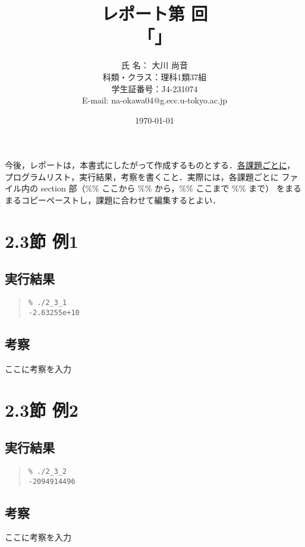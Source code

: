 \documentclass[fontsize=11pt, jafontsize=11pt, paper=a4paper, dvipdfmx]{jlreq}
\title{レポート第  回 \\
  「」}
\author{氏 名：  大川 尚音 \\
        科類・クラス：理科1類37組 \\
        学生証番号：J4-231074 \\
        E-mail: na-okawa04@g.ecc.u-tokyo.ac.jp}
\date{\today}
\begin{document}
\maketitle
%
今後，レポートは，本書式にしたがって作成するものとする．\underline{各課題ごとに}，
プログラムリスト，実行結果，考察を書くこと．実際には，各課題ごとに
ファイル内の section 部（\%\% ここから \%\% から，\%\% ここまで \%\% まで）
をまるまるコピーペーストし，課題に合わせて編集するとよい．

\section{2.3節 例1}

\subsection{実行結果}
\label{sec:results1}

\begin{quote}
\begin{verbatim}
% ./2_3_1
-2.63255e+10
\end{verbatim}
\end{quote}
%
\subsection{考察}
ここに考察を入力

\section{2.3節 例2}

\subsection{実行結果}
\label{sec:results2}

\begin{quote}
\begin{verbatim}
% ./2_3_2
-2094914496
\end{verbatim}
\end{quote}
%
\subsection{考察}
ここに考察を入力
\end{document}
